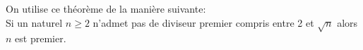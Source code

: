 
On utilise ce théorème de la manière suivante:\\
Si un naturel $n\geq 2$ n'admet pas de diviseur premier compris entre 2 et $\sqrt{n}$ alors $n$ est premier.
